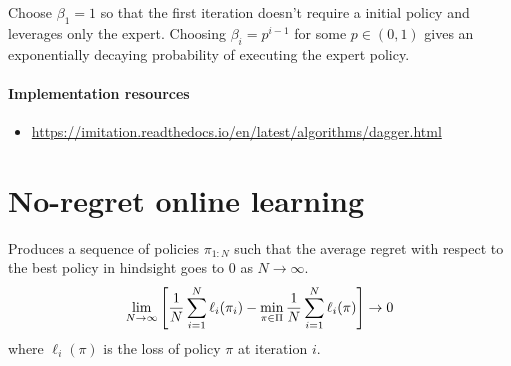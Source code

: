 Choose \( \beta_1 = 1 \) so that the first iteration doesn't require a initial policy and leverages only the expert.
Choosing \( \beta_i = p^{i-1} \) for some \( p \in (0, 1) \) gives an exponentially decaying probability of executing the expert policy.

\paragraph{Implementation resources}
\begin{itemize}
    \item \url{https://imitation.readthedocs.io/en/latest/algorithms/dagger.html}
\end{itemize}

\section{No-regret online learning}

Produces a sequence of policies \( \pi_{1:N} \) such that the average regret with respect to the best policy in hindsight goes to 0 as \( N \to \infty \).
\begin{equation*}
    \lim_{N \to \infty}
    \bbrac{
        \frac{1}{N}
        \sum_{i = 1}^{N}
        \ell_i(\pi_i)
        -
        \min_{\pi \in \Pi}
        \frac{1}{N}
        \sum_{i = 1}^{N}
        \ell_i(\pi)
    }
    \to 0
\end{equation*}
where \( \ell_i(\pi) \) is the loss of policy \( \pi \) at iteration \( i \).
